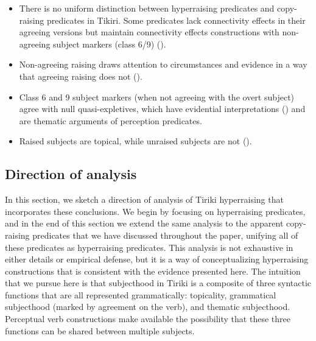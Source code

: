 \documentclass[output=paper,colorlinks,citecolor=brown
]{langscibook}
\begin{document}
\ea 
{}

\begin{itemize}

\item There is no uniform distinction between hyperraising predicates and copy-raising predicates in Tikiri. Some predicates lack connectivity effects in their agreeing versions but maintain connectivity effects constructions with non-agreeing subject markers (class 6/9) ().

\item Non-agreeing raising draws attention to circumstances and evidence in a way that agreeing raising does not ().

\item Class 6 and 9 subject markers (when not agreeing with the overt subject) agree with null quasi-expletives, which have evidential interpretations () and are thematic arguments of perception predicates.

\item Raised subjects are topical, while unraised subjects are not ().

\end{itemize}
\z 

\subsection{Direction of analysis}\label{sec:johnson:DraftAnalysis}

In this section, we sketch a direction of analysis of Tiriki hyperraising that incorporates these conclusions. We begin by focusing on hyperraising predicates, and in the end of this section we extend the same analysis to the apparent copy-raising predicates that we have discussed throughout the paper, unifying all of these predicates as hyperraising predicates. This analysis is not exhaustive in either details or empirical defense, but it is a way of conceptualizing hyperraising constructions that is consistent with the evidence presented here. The intuition that we pursue here is that subjecthood in Tiriki is a composite of three syntactic functions that are all represented grammatically: topicality, grammatical subjecthood (marked by agreement on the verb), and thematic subjecthood. Perceptual verb constructions make available the possibility that these three functions can be shared between multiple subjects. 
\end{document}

